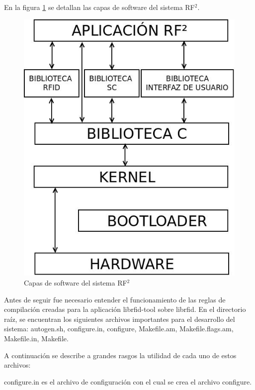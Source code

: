 En la figura \ref{Fig:SW} se detallan las capas de software del sistema RF$^{2}$.

\begin{figure}[H]
\centering
  \begin{center}
  \includegraphics[scale=.4]{Imagenes/SW.jpg} 
  \end{center}
  \caption{Capas de software del sistema RF${^{2}}$}\label{Fig:SW} 
\end{figure}

\bigskip
Antes de seguir fue necesario entender el funcionamiento de las reglas de compilación creadas para la aplicación librfid-tool sobre librfid. En el directorio raíz, se encuentran los siguientes archivos importantes para el desarrollo del sistema: autogen.sh, configure.in, configure, Makefile.am, Makefile.flags.am, Makefile.in, Makefile.

\bigskip
A continuación se describe a grandes rasgos la utilidad de cada uno de estos archivos:

\bigskip
configure.in es el archivo de configuración con el cual se crea el archivo configure.


